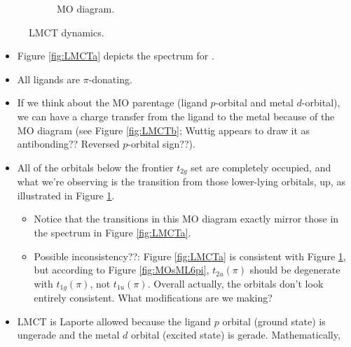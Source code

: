 \documentclass[../notes.tex]{subfiles}
\begin{document}
\begin{itemize}
\begin{figure}[h!]
\begin{subfigure}[b]{0.3\linewidth}
            \caption{MO diagram.}
            \label{fig:LMCTc}
        \end{subfigure}
        \caption{LMCT dynamics.}
        \label{fig:LMCT}
    \end{figure}
    \begin{itemize}
        \item Figure \ref{fig:LMCTa} depicts the spectrum for .
        \item All ligands are $\pi$-donating.
        \item If we think about the MO parentage (ligand $p$-orbital and metal $d$-orbital), we can have a charge transfer from the ligand to the metal because of the MO diagram (see Figure \ref{fig:LMCTb}; Wuttig appears to draw it as antibonding?? Reversed $p$-orbital sign??).
        \item All of the orbitals below the frontier $t_{2g}$  set are completely occupied, and what we're observing is the transition from those lower-lying orbitals, up, as illustrated in Figure \ref{fig:LMCTc}.
        \begin{itemize}
            \item Notice that the transitions in this MO diagram exactly mirror those in the spectrum in Figure \ref{fig:LMCTa}.
            \item Possible inconsistency??: Figure \ref{fig:LMCTa} is consistent with Figure \ref{fig:LMCTc}, but according to Figure \ref{fig:MOsML6pi}, $t_{2u}(\pi)$ should be degenerate with $t_{1g}(\pi)$, not $t_{1u}(\pi)$. Overall actually, the orbitals don't look entirely consistent. What modifications are we making?
        \end{itemize}
        \item LMCT is Laporte allowed because the ligand $p$ orbital (ground state) is ungerade and the metal $d$ orbital (excited state) is gerade. Mathematically,
        \begin{equation*}

\end{equation*}
\end{itemize}
\end{itemize}
\end{document}
